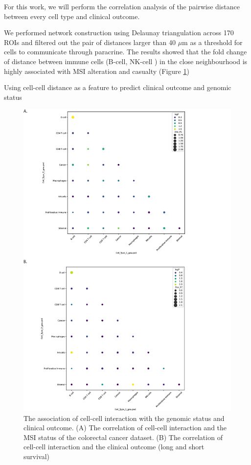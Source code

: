 For this work, we will perform the correlation analysis of the pairwise distance between every cell type and clinical outcome. 

We performed network construction using Delaunay triangulation across 170 ROIs and filtered out the pair of distances larger than 40 $\mu$m as a threshold for cells to communicate through paracrine. The results showed that the fold change of distance between immune cells (B-cell, NK-cell ) in the close neighbourhood is highly associated with MSI alteration and casualty (Figure \ref{Chap4:fig2})

Using cell-cell distance as a feature to predict clinical outcome and genomic status

\begin{figure}
    \centering
    \includegraphics[width=0.8\columnwidth]{Chapter4/Figures/Chap4_figure1.png}
    \caption[The association of cell-cell interaction with the genomic status and clinical outcome]{The association of cell-cell interaction with the genomic status and clinical outcome. (A) The correlation of cell-cell interaction and the MSI status of the colorectal cancer dataset. (B) The correlation of cell-cell interaction and the clinical outcome (long and short survival)}
    \label{Chap4:fig2}
    
\end{figure}
